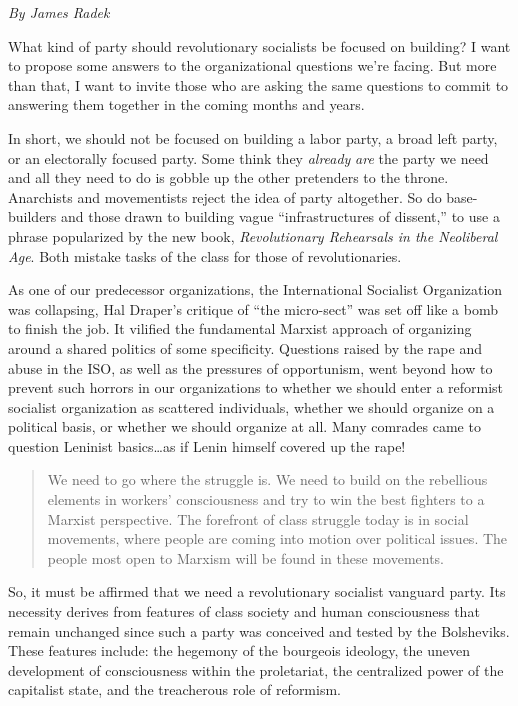 \emph{By James Radek}

What kind of party should revolutionary socialists be focused on building? I want to propose some answers to the organizational questions we're facing. But more than that, I want to invite those who are asking the same questions to commit to answering them together in the coming months and years.

In short, we should not be focused on building a labor party, a broad left party, or an electorally focused party. Some think they \emph{already} \emph{are} the party we need and all they need to do is gobble up the other pretenders to the throne. Anarchists and movementists reject the idea of party altogether. So do base-builders and those drawn to building vague ``infrastructures of dissent,'' to use a phrase popularized by the new book, \emph{Revolutionary Rehearsals in the Neoliberal Age}. Both mistake tasks of the class for those of revolutionaries.

As one of our predecessor organizations, the International Socialist Organization was collapsing, Hal Draper's critique of ``the micro-sect'' was set off like a bomb to finish the job. It vilified the fundamental Marxist approach of organizing around a shared politics of some specificity. Questions raised by the rape and abuse in the ISO, as well as the pressures of opportunism, went beyond how to prevent such horrors in our organizations to whether we should enter a reformist socialist organization as scattered individuals, whether we should organize on a political basis, or whether we should organize at all. Many comrades came to question Leninist basics\ldots as if Lenin himself covered up the rape!

\blockquote{We need to go where the struggle is. We need to build on the rebellious elements in workers' consciousness and try to win the best fighters to a Marxist perspective. The forefront of class struggle today is in social movements, where people are coming into motion over political issues. The people most open to Marxism will be found in these movements.}

So, it must be affirmed that we need a revolutionary socialist vanguard party. Its necessity derives from features of class society and human consciousness that remain unchanged since such a party was conceived and tested by the Bolsheviks. These features include: the hegemony of the bourgeois ideology, the uneven development of consciousness within the proletariat, the centralized power of the capitalist state, and the treacherous role of reformism.


